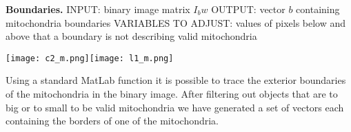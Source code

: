 \documentclass[a4paper, 11pt]{article}
\begin{document}
\textbf{Boundaries.} 
\newline
\newline
INPUT: binary image matrix $I_bw$
\newline
OUTPUT: vector $b$ containing mitochondria boundaries
\newline
VARIABLES TO ADJUST: values of pixels below and above that a boundary is not describing valid mitochondria
\newline
\newline
\begin{center}\texttt{[image: c2\_m.png]}\texttt{[image: l1\_m.png]}
\end{center}
Using a standard MatLab function it is possible to trace the exterior boundaries of the mitochondria in the binary image. After filtering out objects that are to big or to small to be valid mitochondria we have generated a set of vectors each containing the borders of one of the mitochondria.
\end{document}
